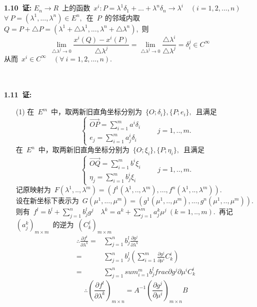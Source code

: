 \noindent
\\
\\
{\textbf{1.10\ 证:}}
	$E_n\rightarrow R$\ 上的函数\ $x^i:P=\lambda^1\delta_1+...+\lambda^n\delta_n\rightarrow \lambda^i\quad(i=1,2,...,n)$
	\\
	$\forall\ P=(\lambda^1,...,\lambda^n)\in E^n,$\ 在\ $P$\ 的邻域内取\ $Q=P+\triangle P=(\lambda^1+\triangle\lambda^1,...,\lambda^n+\triangle\lambda^n)$,\ 则
	$$
	\lim\limits_{\triangle\lambda^j\to 0}\frac{x^i(Q)-x^i(P)}{\triangle \lambda^j}=\lim\limits_{\triangle\lambda^j\to 0}\frac{\triangle \lambda^i}{\triangle \lambda^j}=\delta_i^j\in C^{\infty}
	$$ 
	从而\ $x^i\in C^\infty\quad (\forall\  i=1,2,...,n).$
	
\noindent
\\
\\
{\textbf{1.11\ 证:}} 
\begin{itemize}
\item [(1)]
在\ $E^m$\ 中，取两新旧直角坐标分别为\ $\{O;\delta_i\},\{P;e_i\},$\ 且满足\ 
$$
\left\{
\begin{array}{c}
       \overrightarrow{OP}=\sum_{i=1}^{m}a^i\delta_i
       \\
       e_j=\sum_{i=1}^{m}a_j^i\delta_i
\end{array}
\qquad j=1,..,m.\right.
$$
 在\ $E^n$\ 中，取两新旧直角坐标分别为\ $\{O;\xi_i\},\{P;\eta_i\},$\ 且满足\ 
$$
\left\{
\begin{array}{c}
\overrightarrow{OQ}=\sum_{i=1}^{m}b^i\xi_i
\\
\eta_j=\sum_{i=1}^{m}b_j^i\xi_i
\end{array}
\qquad j=1,..,m.\right.
$$
记原映射为\ $F(\lambda^1,..,\lambda^m)=(f^1(\lambda^1,..,\lambda^m),...,f^n(\lambda^1,..,\lambda^m)).$
\\
设在新坐标下表示为\ $G(\mu^1,...,\mu^m)=(g^1(\mu^1,..,\mu^m),...,g^n(\mu^1,..,\mu^m))$.
\\
则有\ $f^l=b^l+\sum_{j=1}^{n}b^l_jg^j\quad \lambda^k=a^k+\sum_{j=1}^{m}a^k_j\mu^j\ (k=1,..,m).$\ 再记\ $(a^k_j)_{m\times m}$\ 的逆为\ $(C_k^j)_{m\times m}$
\begin{align*}
\therefore \frac{\partial f^l}{\partial \lambda^k}
    =&\sum_{j=1}^{n}b^l_j\frac{\partial g^j}{\partial\lambda^k}
    \\
    =&\sum_{j=1}^{n}b_j^l(\sum_{i=1}^m\frac{\partial g^j}{\partial \mu^i}C_k^i)
    \\
    =&\sum_{j=1}^{n}sum_{i=1}^mb_j^lfrac{\partial g^j}{\partial \mu^i}C_k^i
\end{align*}
$$\therefore (\frac{\partial f^l}{\partial \lambda^k})_{m\times n}=A^{-1}(\frac{\partial g^j}{\partial \mu^i})_{m\times n}B$$

\end{itemize}
